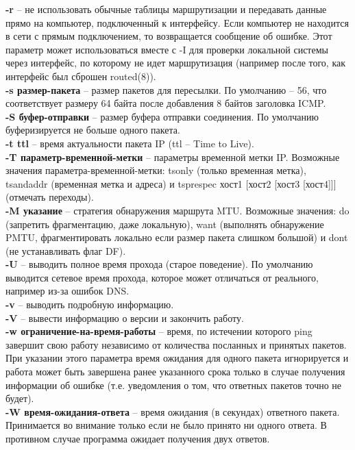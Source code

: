 \documentclass[a4paper]{article}
\begin{document}
\textbf{-r} -- не использовать обычные таблицы маршрутизации и передавать данные прямо на компьютер, подключенный к интерфейсу. Если компьютер не находится в сети с прямым подключением, то возвращается сообщение об ошибке. Этот параметр может использоваться вместе с -I для проверки локальной системы через интерфейс, по которому не идет маршрутизация (например после того, как интерфейс был сброшен routed(8)).\\
\textbf{-s размер-пакета} -- размер пакетов для пересылки. По умолчанию -- 56, что соответствует размеру 64 байта после добавления 8 байтов заголовка ICMP.\\
\textbf{-S буфер-отправки} -- размер буфера отправки соединения. По умолчанию буферизируется не больше одного пакета.\\
\textbf{-t ttl} -- время актуальности пакета IP (ttl -- Time to Live).\\
\textbf{-T параметр-временной-метки} -- параметры временной метки IP. Возможные значения параметра-временной-метки: tsonly (только временная метка), tsandaddr (временная метка и адреса) и tsprespec хост1 [хост2 [хост3 [хост4]]] (отмечать переходы).\\
\textbf{-M указание} -- стратегия обнаружения маршрута MTU. Возможные значения: do (запретить фрагментацию, даже локальную), want (выполнять обнаружение PMTU, фрагментировать локально если размер пакета слишком большой) и dont (не устанавливать флаг DF).\\
\textbf{-U} -- выводить полное время прохода (старое поведение). По умолчанию выводится сетевое время прохода, которое может отличаться от реального, например из-за ошибок DNS.\\
\textbf{-v} -- выводить подробную информацию.\\
\textbf{-V} -- вывести информацию о версии и закончить работу.\\
\textbf{-w ограничение-на-время-работы} -- время, по истечении которого ping завершит свою работу независимо от количества посланных и принятых пакетов. При указании этого параметра время ожидания для одного пакета игнорируется и работа может быть завершена ранее указанного срока только в случае получения информации об ошибке (т.е. уведомления о том, что ответных пакетов точно не будет).\\
\textbf{-W время-ожидания-ответа} -- время ожидания (в секундах) ответного пакета. Принимается во внимание только если не было принято ни одного ответа. В противном случае программа ожидает получения двух ответов.
\end{document}
